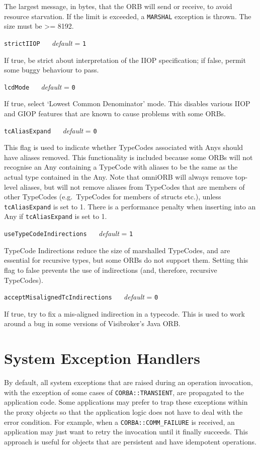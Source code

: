 \documentclass[11pt,twoside,a4paper]{book}
\makeatletter
\newcommand{\code}[1]{\texttt{#1}}
\newcommand{\confopt}[2]
  {\vspace{\baselineskip}\par\noindent\code{#1} ~~ \textit{default} =
   \code{#2}\\[-1ex]\@afterheading}
\makeatother
\begin{document}
The largest message, in bytes, that the ORB will send or receive, to
avoid resource starvation. If the limit is exceeded, a \code{MARSHAL}
exception is thrown. The size must be >= 8192.

\confopt{strictIIOP}{1}

If true, be strict about interpretation of the IIOP specification; if
false, permit some buggy behaviour to pass.


\confopt{lcdMode}{0}

If true, select `Lowest Common Denominator' mode. This disables
various IIOP and GIOP features that are known to cause problems with
some ORBs.


\confopt{tcAliasExpand}{0}

This flag is used to indicate whether TypeCodes associated with Anys
should have aliases removed. This functionality is included because
some ORBs will not recognise an Any containing a TypeCode with aliases
to be the same as the actual type contained in the Any. Note that
omniORB will always remove top-level aliases, but will not remove
aliases from TypeCodes that are members of other TypeCodes (e.g.\
TypeCodes for members of structs etc.), unless \code{tcAliasExpand} is
set to 1. There is a performance penalty when inserting into an Any if
\code{tcAliasExpand} is set to 1.


\confopt{useTypeCodeIndirections}{1}

TypeCode Indirections reduce the size of marshalled TypeCodes, and are
essential for recursive types, but some ORBs do not support them.
Setting this flag to false prevents the use of indirections (and,
therefore, recursive TypeCodes).


\confopt{acceptMisalignedTcIndirections}{0}

If true, try to fix a mis-aligned indirection in a typecode. This is
used to work around a bug in some versions of Visibroker's Java ORB.


\vspace{2\baselineskip}


\section{System Exception Handlers}

By default, all system exceptions that are raised during an operation
invocation, with the exception of some cases of
\code{CORBA::TRANSIENT}, are propagated to the application code. Some
applications may prefer to trap these exceptions within the proxy
objects so that the application logic does not have to deal with the
error condition. For example, when a \code{CORBA::COMM\_FAILURE} is
received, an application may just want to retry the invocation until
it finally succeeds. This approach is useful for objects that are
persistent and have idempotent operations.
\end{document}
